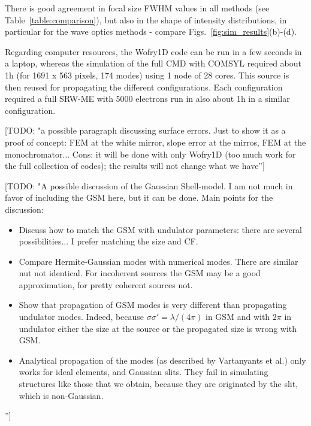 \documentclass{iucr}              %
\newcommand{\todo}[1]{{\color{red}[TODO: "#1'']}}
\begin{document}


There is good agreement in focal size FWHM values in all methods (see Table~\ref{table:comparison}), but also in the shape of intensity distributions, in particular for the wave optics methods - compare Figs.~\ref{fig:sim_results}(b)-(d). 

Regarding computer resources, the Wofry1D code can be run in a few seconds in a laptop, whereas the simulation of the full CMD with COMSYL required about 1h (for 1691 x 563 pixels, 174 modes) using 1 node of 28 cores. This source is then reused for propagating the different configurations. Each configuration required a full SRW-ME with 5000 electrons run in also about 1h in a similar configuration. 

\todo{a possible paragraph discussing surface errors. Just to show it as a proof of concept: FEM at the white mirror, slope error at the mirros, FEM at the monochromator... Cons: it will be done with only Wofry1D (too much work for the full collection of codes); the results will not change what we have}


\todo{A possible discussion of the Gaussian Shell-model. I am not much in favor of including the GSM here, but it can be done. Main points for the discussion:

\begin{itemize}
\item Discuss how to match the GSM with undulator parameters: there are several possibilities... I prefer matching the size and CF. 
\item Compare Hermite-Gaussian modes with numerical modes. There are similar nut not identical. For incoherent sources the GSM may be a good approximation, for pretty coherent sources not. 
\item Show that propagation of GSM modes is very different than propagating undulator modes. Indeed, because $\sigma \sigma' = \lambda / (4 \pi)$ in GSM and with $2\pi$ in undulator either the size at the source or the propagated size is wrong with GSM.
\item Analytical propagation of the modes (as described by Vartanyants et al.) only works for ideal elements, and Gaussian slits. They fail in simulating structures like those that we obtain, because they are originated by the slit, which is non-Gaussian.
\end{itemize}
}
\end{document}
